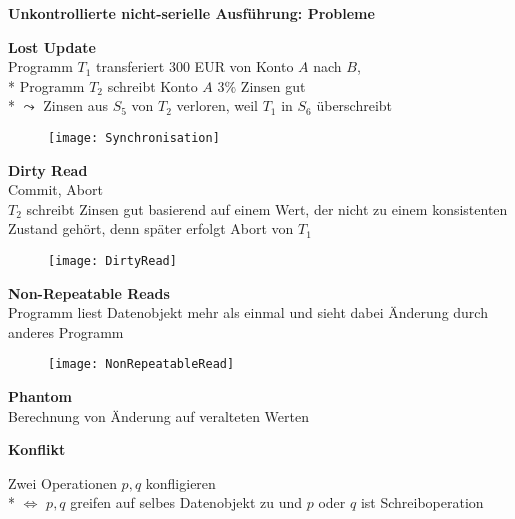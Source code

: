 \textbf{Unkontrollierte nicht-serielle Ausführung: Probleme}
\begin{items}
	\item \textbf{Lost Update}\\
		 Programm \( T_1 \) transferiert 300 EUR von Konto \( A \) nach \( B \),
		\\*
		Programm \( T_2 \) schreibt Konto \( A \) \( 3 \% \) Zinsen gut
		\\*
		\( \leadsto \) Zinsen aus \( S_5 \) von \( T_2 \) verloren, weil \( T_1 \) in \( S_6 \) überschreibt

	\begin{figure}[H]\centering\label{Synchronisation}\texttt{[image: Synchronisation]}\end{figure}
	
	\item \textbf{Dirty Read}\\
		Commit, Abort \\
		\( T_2 \) schreibt Zinsen gut basierend auf einem Wert, der nicht zu einem konsistenten Zustand gehört, denn später erfolgt Abort von \( T_1 \)

	\begin{figure}[H]\centering\label{DirtyRead}\texttt{[image: DirtyRead]}\end{figure}
	
	\item \textbf{Non-Repeatable Reads}\\
		 Programm liest Datenobjekt mehr als einmal und sieht dabei Änderung durch anderes Programm
	\begin{figure}[H]\centering\label{NonRepeatableRead}\texttt{[image: NonRepeatableRead]}\end{figure}
	
	\item \textbf{Phantom}\\
		Berechnung von Änderung auf veralteten Werten
\end{items}

\textbf{Konflikt}
\begin{items}
	\item Zwei Operationen \( p, q \) konfligieren
		\\*
		\( \Leftrightarrow \) \( p,q \) greifen auf selbes Datenobjekt zu und \( p \) oder \( q \) ist Schreiboperation
\end{items}

